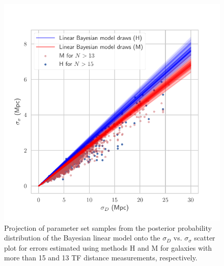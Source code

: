 \documentclass[a4paper,fleqn,usenatbib]{mnras}
\begin{document}
\begin{figure}
	\includegraphics[scale=0.7]{drawsee}
    \caption{Projection of parameter set samples from the posterior probability distribution of the Bayesian linear model onto the $\sigma_D$ vs. $\sigma_\sigma$ scatter plot for errors estimated using methods H and M for galaxies with more than 15 and 13 TF distance measurements, respectively.}
    \label{fig:drawsee}
\end{figure}
\end{document}

